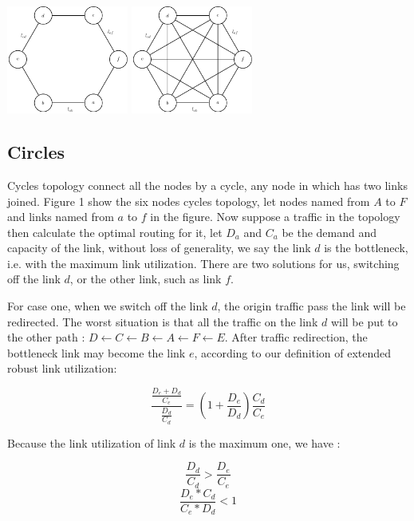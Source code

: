 \documentclass[conference]{IEEEtran}
\begin{document}
\includegraphics[width=4cm]{circle}
\includegraphics[width=4cm]{clique}

\subsection{Circles}
Cycles topology connect all the nodes by a cycle, any node in which has two links joined. Figure 1 show the six
nodes cycles topology, let nodes named from $A$ to $F$ and links named from $a$ to $f$ in the figure.
Now suppose a traffic in the topology then calculate the optimal routing for it,
let $D_a$ and $C_a$ be the demand and capacity of the link, without loss of generality, we say the link $d$ is the 
bottleneck, i.e. with the maximum link utilization. There are two solutions for us, switching off the link $d$,
or the other link, such as link $f$.


For case one, when we switch off the link $d$, the origin traffic pass the link will be redirected. The worst situation
is that all the traffic on the link $d$ will be put to the other path : $D \leftarrow C \leftarrow B \leftarrow A \leftarrow 
F \leftarrow E$. After traffic redirection, the bottleneck link may become the link $e$, according to our definition of
extended robust link utilization:

\begin{equation}
    \frac {\frac{D_e + D_d} {C_e}} {\frac {D_d}{C_d}} = (1 + \frac{D_e}{D_d}) \frac{C_d}{C_e}
\end{equation}

Because the link utilization of link $d$ is the maximum one, we have :

\begin{equation}
    \frac{D_d}{C_d} > \frac{D_e}{C_e} 
\end{equation}
\begin{equation}
    \frac{D_e * C_d}{C_e * D_d} < 1
\end{equation}
\end{document}
